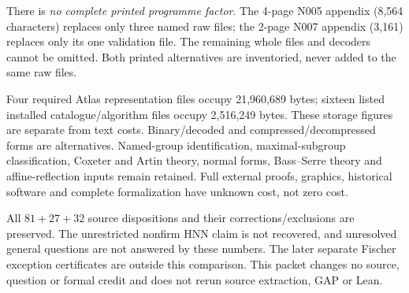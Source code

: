 \documentclass[11pt,a4paper]{article}
\begin{document}
There is \emph{no complete printed programme factor}. The 4-page N005 appendix (8,564 characters) replaces only three named raw files; the 2-page N007 appendix (3,161) replaces only its one validation file. The remaining whole files and decoders cannot be omitted. Both printed alternatives are inventoried, never added to the same raw files.

Four required Atlas representation files occupy 21,960,689 bytes; sixteen listed installed catalogue/algorithm files occupy 2,516,249 bytes. These storage figures are separate from text costs. Binary/decoded and compressed/decompressed forms are alternatives. Named-group identification, maximal-subgroup classification, Coxeter and Artin theory, normal forms, Bass--Serre theory and affine-reflection inputs remain retained. Full external proofs, graphics, historical software and complete formalization have unknown cost, not zero cost.

All $81+27+32$ source dispositions and their corrections/exclusions are preserved. The unrestricted nonfirm HNN claim is not recovered, and unresolved general questions are not answered by these numbers. The later separate Fischer exception certificates are outside this comparison. This packet changes no source, question or formal credit and does not rerun source extraction, GAP or Lean.
\end{document}
